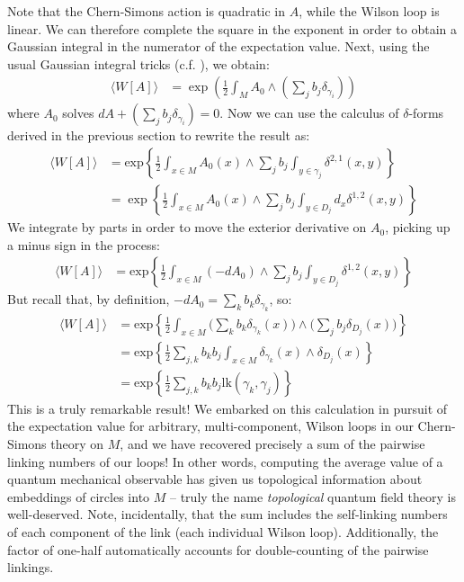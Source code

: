 \documentclass[12pt]{article}
\begin{document}
Note that the Chern-Simons action is quadratic in $A$, while the Wilson loop is linear. We can therefore complete the square in the exponent in order to obtain a Gaussian integral in the numerator of the expectation value. Next, using the usual Gaussian integral tricks (c.f. \cite{infinite}), we obtain:
\begin{align}
\langle W[A] \rangle &= \exp\left(\frac{1}{2} \int_M A_0 \wedge (\sum_j b_j \delta_{\gamma_i}) \right)
\end{align}
where $A_0$ solves $dA + (\sum_j b_j \delta_{\gamma_i}) = 0$. Now we can use the calculus of $\delta$-forms derived in the previous section to rewrite the result as:
\begin{align*}
\langle W[A] \rangle &= \text{exp} \left\{ \frac{1}{2} \int_{x\in M} A_0(x)\wedge \sum_j b_j \int_{y\in \gamma_j} \delta^{2,1} (x,y)     \right\} \\
	&= \exp\left\{\frac{1}{2} \int_{x\in M} A_0(x) \wedge \sum_j b_j \int_{y\in D_j} d_x \delta^{1,2} (x,y)\right\}
\end{align*}
We integrate by parts in order to move the exterior derivative on $A_0$, picking up a minus sign in the process:
\begin{align*}
\langle W[A] \rangle &= \text{exp} \left\{ \frac{1}{2} \int_{x\in M} (-dA_0) \wedge \sum_j b_j \int_{y\in D_j} \delta^{1,2} (x,y)  \right\}
\end{align*}
But recall that, by definition, $-dA_0 = \sum_k b_k \delta_{\gamma_k}$, so:
\begin{align*}
\langle W[A] \rangle &= \text{exp} \left\{  \frac{1}{2} \int_{x\in M} \big( \sum_k b_k \delta_{\gamma_k} (x) \big) \wedge \big( \sum_j b_j \delta_{D_j} (x) \big) \right\} \\
	&= \text{exp} \left\{  \frac{1}{2} \sum_{j,k} b_k b_j \int_{x\in M} \delta_{\gamma_k}(x) \wedge  \delta_{D_j} (x) \right\} \\
    &= \text{exp} \left\{  \frac{1}{2} \sum_{j,k} b_k b_j \text{lk}(\gamma_k, \gamma_j) \right\}
\end{align*}
This is a truly remarkable result! We embarked on this calculation in pursuit of the expectation value for arbitrary, multi-component, Wilson loops in our Chern-Simons theory on $M$, and we have recovered precisely a sum of the pairwise linking numbers of our loops!
In other words, computing the average value of a quantum mechanical observable has given us topological information about embeddings of circles into $M$ -- truly the name \textit{topological} quantum field theory is well-deserved. Note, incidentally, that the sum includes the self-linking numbers of each component of the link (each individual Wilson loop). Additionally, the factor of one-half automatically accounts for double-counting of the pairwise linkings.
\end{document}
